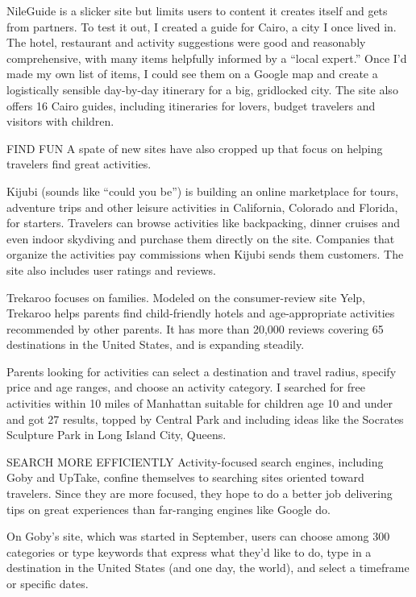 ﻿\documentclass[12pt]{article}
\begin{document}
NileGuide is a slicker site but limits users to content it creates itself and gets from partners. To
test it out, I created a guide for Cairo, a city I once lived in. The hotel, restaurant and activity
suggestions were good and reasonably comprehensive, with many items helpfully informed by a ``local
expert.'' Once I'd made my own list of items, I could see them on a Google map and create a
logistically sensible day-by-day itinerary for a big, gridlocked city. The site also offers 16 Cairo
guides, including itineraries for lovers, budget travelers and visitors with children.

FIND FUN A spate of new sites have also cropped up that focus on helping travelers find great
activities.

Kijubi (sounds like ``could you be'') is building an online marketplace for tours, adventure trips
and other leisure activities in California, Colorado and Florida, for starters. Travelers can browse
activities like backpacking, dinner cruises and even indoor skydiving and purchase them directly on
the site. Companies that organize the activities pay commissions when Kijubi sends them customers.
The site also includes user ratings and reviews.

Trekaroo focuses on families. Modeled on the consumer-review site Yelp, Trekaroo helps parents find
child-friendly hotels and age-appropriate activities recommended by other parents. It has more than
20,000 reviews covering 65 destinations in the United States, and is expanding steadily.

Parents looking for activities can select a destination and travel radius, specify price and age
ranges, and choose an activity category. I searched for free activities within 10 miles of Manhattan
suitable for children age 10 and under and got 27 results, topped by Central Park and including
ideas like the Socrates Sculpture Park in Long Island City, Queens.

SEARCH MORE EFFICIENTLY Activity-focused search engines, including Goby and UpTake, confine
themselves to searching sites oriented toward travelers. Since they are more focused, they hope to
do a better job delivering tips on great experiences than far-ranging engines like Google do.

On Goby's site, which was started in September, users can choose among 300 categories or type
keywords that express what they'd like to do, type in a destination in the United States (and one
day, the world), and select a timeframe or specific dates.
\end{document}
